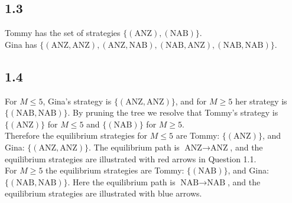 \documentclass{article}
\begin{document}
\subsection*{1.3}
Tommy has the set of strategies $\{(\mbox{ANZ}), (\mbox{NAB})\}$.\\[2mm]
Gina has $\{(\mbox{ANZ}, \mbox{ANZ}), (\mbox{ANZ}, \mbox{NAB}), (\mbox{NAB}, \mbox{ANZ}),(\mbox{NAB}, \mbox{NAB})\}$.

\subsection*{1.4}
For $M\leq 5$, Gina's strategy is $\{(\mbox{ANZ}, \mbox{ANZ})\}$, and for $M\geq 5$ her strategy is $\{(\mbox{NAB}, \mbox{NAB})\}$. By pruning the tree we resolve that Tommy's strategy is $\{(\mbox{ANZ})\}$ for $M\leq 5$ and $\{(\mbox{NAB})\}$ for $M\geq 5$.\\[2mm]
Therefore the equilibrium strategies for $M\leq 5$ are Tommy: $\{(\mbox{ANZ})\}$, and Gina: $\{(\mbox{ANZ}, \mbox{ANZ})\}$. The equilibrium path is $\mbox{ANZ} \rightarrow \mbox{ANZ}$, and the equilibrium strategies are illustrated with {\color{red}red} arrows in Question 1.1.\\[2mm]
For $M\geq 5$ the equilibrium strategies are Tommy: $\{(\mbox{NAB})\}$, and Gina: $\{(\mbox{NAB}, \mbox{NAB})\}$. Here the equilibrium path is $\mbox{NAB} \rightarrow \mbox{NAB}$, and the equilibrium strategies are illustrated with {\color{blue}blue} arrows.
\end{document}
